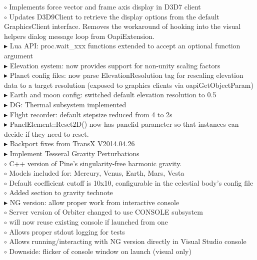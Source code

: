 \documentclass[Orbiter User Manual.tex]{subfiles}
\begin{document}
\begin{sloppypar}
$\circ$ Implements force vector and frame axis display in D3D7 client\\
$\circ$ Updates D3D9Client to retrieve the display options from the default GraphicsClient interface. Removes the workaround of hooking into the visual helpers dialog message loop from OapiExtension.\\
$\blacktriangleright$ Lua API: proc.wait\_xxx functions extended to accept an optional function argument\\
$\blacktriangleright$ Elevation system: now provides support for non-unity scaling factors\\
$\blacktriangleright$ Planet config files: now parse ElevationResolution tag for rescaling elevation data to a target resolution (exposed to graphics clients via oapiGetObjectParam)\\
$\blacktriangleright$ Earth and moon config: switched default elevation resolution to 0.5\\
$\blacktriangleright$ DG: Thermal subsystem implemented\\
$\blacktriangleright$ Flight recorder: default stepsize reduced from 4 to 2s\\
$\blacktriangleright$ PanelElement::Reset2D() now has panelid parameter so that instances can decide if they need to reset.\\
$\blacktriangleright$ Backport fixes from TransX V2014.04.26\\
$\blacktriangleright$ Implement Tesseral Gravity Perturbations\\
$\circ$ C++ version of Pine's singularity-free harmonic gravity.\\
$\circ$ Models included for: Mercury, Venus, Earth, Mars, Vesta\\
$\circ$ Default coefficient cutoff is 10x10, configurable in the celestial body's config file\\
$\circ$ Added section to gravity technote\\
$\blacktriangleright$ NG version: allow proper work from interactive console\\
$\circ$ Server version of Orbiter changed to use CONSOLE subsystem\\
$\circ$ will now reuse existing console if launched from one\\
$\circ$ Allows proper stdout logging for tests\\
$\circ$ Allows running/interacting with NG version directly in Visual Studio console\\
$\circ$ Downside: flicker of console window on launch (visual only)\\

\end{sloppypar}
\end{document}
